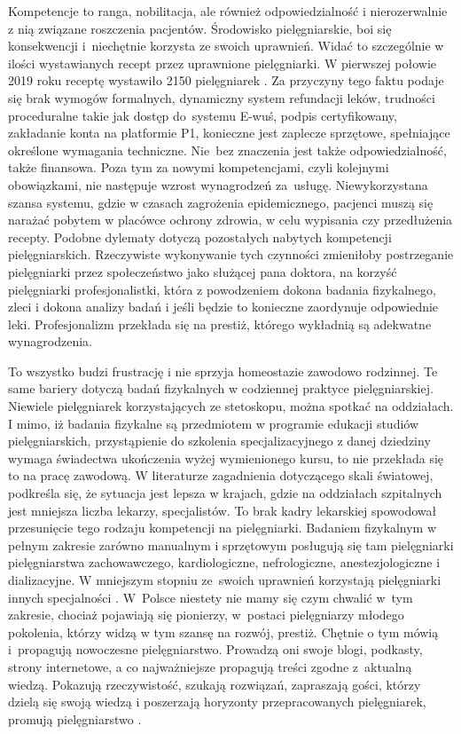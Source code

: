 \documentclass[a4paper,12pt,twoside,openright]{mwrep}
\begin{document}
Kompetencje to ranga, nobilitacja, ale również odpowiedzialność i nierozerwalnie z nią związane roszczenia pacjentów. Środowisko pielęgniarskie, boi się konsekwencji i~niechętnie korzysta ze swoich uprawnień. Widać to szczególnie w ilości wystawianych recept przez uprawnione pielęgniarki. W pierwszej połowie 2019 roku receptę wystawiło 2150 pielęgniarek \cite{model}. Za przyczyny tego faktu podaje się brak wymogów formalnych, dynamiczny system refundacji leków, trudności proceduralne takie jak dostęp do~systemu E-wuś, podpis certyfikowany, zakładanie konta na platformie P1, konieczne jest zaplecze sprzętowe, spełniające określone wymagania techniczne. Nie~bez znaczenia jest także odpowiedzialność, także finansowa. Poza tym za nowymi kompetencjami, czyli kolejnymi obowiązkami, nie następuje wzrost wynagrodzeń za~usługę. Niewykorzystana szansa systemu, gdzie w czasach zagrożenia epidemicznego, pacjenci muszą się narażać pobytem w placówce ochrony zdrowia, w celu wypisania czy przedłużenia recepty. Podobne dylematy dotyczą pozostałych nabytych kompetencji pielęgniarskich. Rzeczywiste wykonywanie tych czynności zmieniłoby postrzeganie pielęgniarki przez społeczeństwo jako służącej pana doktora, na korzyść pielęgniarki profesjonalistki, która z powodzeniem dokona badania fizykalnego, zleci i dokona analizy badań i jeśli będzie to konieczne zaordynuje odpowiednie leki. Profesjonalizm przekłada się na prestiż, którego wykładnią są adekwatne wynagrodzenia. 

To wszystko budzi frustrację i nie sprzyja homeostazie zawodowo rodzinnej.  Te same bariery dotyczą badań fizykalnych w codziennej praktyce pielęgniarskiej. Niewiele  pielęgniarek  korzystających ze stetoskopu,  można spotkać na oddziałach. I mimo, iż badania fizykalne są przedmiotem w programie edukacji studiów pielęgniarskich, przystąpienie do szkolenia specjalizacyjnego z danej dziedziny wymaga świadectwa ukończenia wyżej wymienionego kursu, to nie przekłada się to na pracę zawodową. W literaturze zagadnienia dotyczącego skali światowej, podkreśla się, że sytuacja jest lepsza w krajach, gdzie na oddziałach szpitalnych jest mniejsza liczba lekarzy, specjalistów. To brak kadry lekarskiej spowodował przesunięcie tego rodzaju kompetencji na pielęgniarki. Badaniem fizykalnym w pełnym zakresie zarówno manualnym i sprzętowym posługują się tam pielęgniarki pielęgniarstwa zachowawczego, kardiologiczne, nefrologiczne, anestezjologiczne i dializacyjne. W mniejszym stopniu ze~swoich uprawnień korzystają pielęgniarki innych specjalności \cite{badania}. W~Polsce niestety nie mamy się czym chwalić w~tym zakresie, chociaż pojawiają się pionierzy, w~postaci pielęgniarzy młodego pokolenia, którzy widzą w tym szansę na rozwój, prestiż. Chętnie o tym mówią i~propagują nowoczesne pielęgniarstwo. Prowadzą oni swoje blogi, podkasty, strony internetowe, a co najważniejsze propagują treści zgodne z~aktualną wiedzą.  Pokazują rzeczywistość, szukają rozwiązań, zapraszają gości, którzy dzielą się swoją wiedzą i poszerzają horyzonty przepracowanych pielęgniarek, promują pielęgniarstwo \cite{spoty}.
\end{document}
